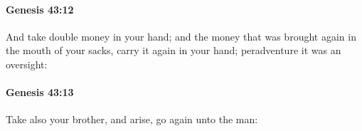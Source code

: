		\paragraph{Genesis 43:12} %
			\label{GENESIS-43-12}

			And take double money in your hand; and the money that was brought again in the mouth of your sacks, carry it again in your hand; peradventure it was an oversight:


		\paragraph{Genesis 43:13} %
			\label{GENESIS-43-13}

			Take also your brother, and arise, go again unto the man:


